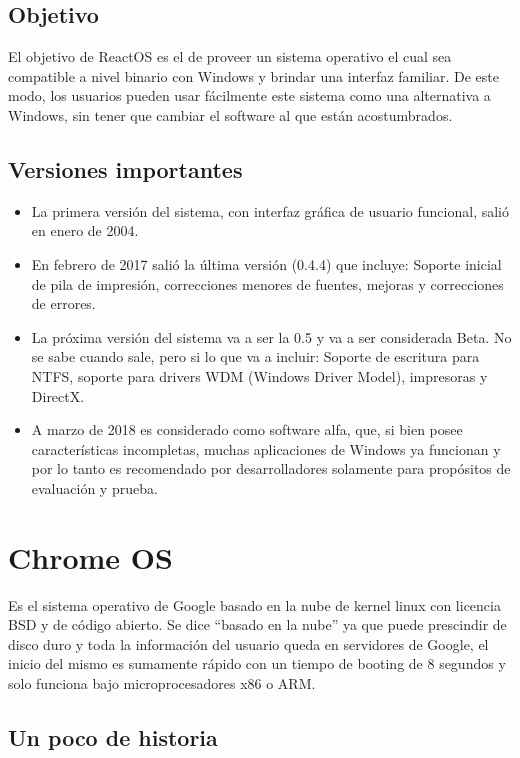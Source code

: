 \subsection{Objetivo}

El objetivo de ReactOS es el de proveer un sistema operativo el cual sea compatible a nivel binario con Windows y brindar una interfaz familiar. De este modo, los usuarios pueden usar fácilmente este sistema como una alternativa a Windows, sin tener que cambiar el software al que están acostumbrados.

\subsection{Versiones importantes}

\begin{itemize}
	\item La primera versión del sistema, con interfaz gráfica de usuario funcional, salió en enero de 2004.
	\item En febrero de 2017 salió la última versión (0.4.4) que incluye: Soporte inicial de pila de impresión, correcciones menores de fuentes, mejoras y correcciones de errores.
	\item La próxima versión del sistema va a ser la 0.5 y va a ser considerada Beta. No se sabe cuando sale, pero si lo que va a incluir: Soporte de escritura para NTFS, soporte para drivers WDM (Windows Driver Model), impresoras y DirectX.
	\item A marzo de 2018 es considerado como software alfa, que, si bien posee características incompletas, muchas aplicaciones de Windows ya funcionan y por lo tanto es recomendado por desarrolladores solamente para propósitos de evaluación y prueba.
\end{itemize}

\section{Chrome OS}

Es el sistema operativo de Google basado en la nube de kernel linux con licencia BSD y de c\'odigo abierto. Se dice ``basado en la nube'' ya que puede prescindir de disco duro y toda la informaci\'on del usuario queda en servidores de Google, el inicio del mismo es sumamente r\'apido con un tiempo de booting de 8 segundos y solo funciona bajo microprocesadores x86 o ARM.

\subsection{Un poco de historia}

